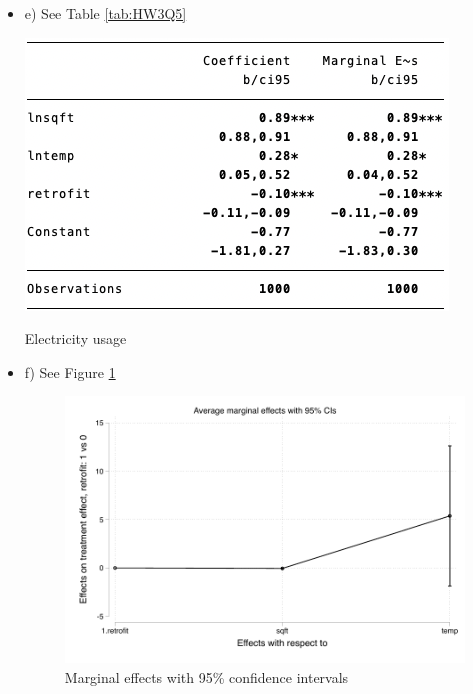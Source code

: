 \documentclass{article}
\begin{document}
\begin{enumerate}
\begin{itemize}
\vspace{0.5cm}
Let's take the derivative of the equation above,




\begin{align}
\ln(y_i) &= \alpha + \ln(\delta)d_i + \gamma\ln(z_i) + \eta_i \\
y_i &= \exp\left(\alpha + \ln(\delta)d_i + \gamma\ln(z_i) + \eta_i\right)  \\
\frac{\partial y_i}{\partial z_i} &= \frac{\gamma}{z_i} \exp\left(\alpha + \ln(\delta)d_i + \gamma\ln(z_i) + \eta_i\right)
\end{align}

if we change ${z_i}$ 1 unit, ${y_i}$ change ${\gamma}{\frac{y_i}{z_i}}$
\vspace{0.5cm}

\item e)
\vspace{0.5cm}
\noindent See Table \ref{tab:HW3Q5}
\begin{table}[]
    \centering
     \includegraphics[]{HW3Q5.png}
    \caption{Electricity usage}
    \label{tab:HW3Q5}
\end{table}
\vspace{0.5cm}

\item f)
\vspace{0.5cm}
\noindent See Figure \ref{fig:HW3Q6} 
\begin{figure}[]
    \centering
     \includegraphics{HW3Q6.pdf}
    \caption{Marginal effects with 95\% confidence intervals}
    \label{fig:HW3Q6}
\end{figure}


\end{itemize}
\end{enumerate}
\end{document}
